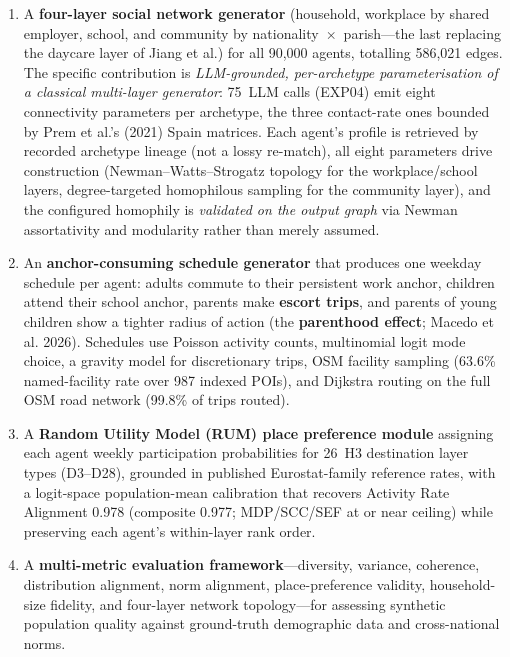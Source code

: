 \documentclass[a4paper,12pt]{article}
\begin{document}
\begin{enumerate}
      both---mirroring the canonical activity-based ordering (households $\rightarrow$
      anchors $\rightarrow$ network $\rightarrow$ schedules; Jiang 2022; MATSim).
\item A \textbf{four-layer social network generator} (household, workplace by shared
      employer, school, and community by nationality~$\times$~parish---the last
      replacing the daycare layer of Jiang et al.) for all 90,000 agents, totalling
      586{,}021 edges. The specific contribution is \emph{LLM-grounded, per-archetype
      parameterisation of a classical multi-layer generator}: 75~LLM calls (EXP04)
      emit eight connectivity parameters per archetype, the three contact-rate ones
      bounded by Prem et al.'s (2021) Spain matrices. Each agent's profile is retrieved
      by recorded archetype lineage (not a lossy re-match), all eight parameters drive
      construction (Newman--Watts--Strogatz topology for the workplace/school layers,
      degree-targeted homophilous sampling for the community layer), and the configured
      homophily is \emph{validated on the output graph} via Newman assortativity and
      modularity rather than merely assumed.
\item An \textbf{anchor-consuming schedule generator} that produces one weekday
      schedule per agent: adults commute to their persistent work anchor, children
      attend their school anchor, parents make \textbf{escort trips}, and parents of
      young children show a tighter radius of action (the \textbf{parenthood effect};
      Macedo et al. 2026). Schedules use Poisson activity counts, multinomial logit
      mode choice, a gravity model for discretionary trips, OSM facility sampling
      (63.6\% named-facility rate over 987 indexed POIs), and Dijkstra routing on the
      full OSM road network (99.8\% of trips routed).
\item A \textbf{Random Utility Model (RUM) place preference module} assigning each
      agent weekly participation probabilities for 26~H3 destination layer types
      (D3--D28), grounded in published Eurostat-family reference rates, with a
      logit-space population-mean calibration that recovers Activity Rate Alignment
      0.978 (composite 0.977; MDP/SCC/SEF at or near ceiling) while preserving each
      agent's within-layer rank order.
\item A \textbf{multi-metric evaluation framework}---diversity, variance, coherence,
      distribution alignment, norm alignment, place-preference validity, household-size
      fidelity, and four-layer network topology---for assessing synthetic population
      quality against ground-truth demographic data and cross-national norms.
\end{enumerate}
\end{document}
